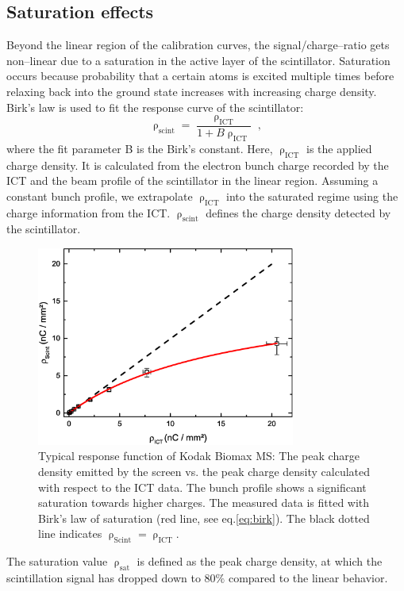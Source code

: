 \documentclass[%
preprint,
amsmath,
amssymb,
aip,
rsi, 
numerical,
floatfix,
]{revtex4-1}
\begin{document}
\subsection{\label{Se}Saturation effects}
Beyond the linear region of the calibration curves, the signal/charge--ratio gets non--linear due to a saturation in the active layer of the scintillator.
Saturation occurs because probability that a certain atoms is excited multiple times before relaxing back into the ground state increases with increasing charge density.
Birk’s law is used to fit the response curve of the scintillator:
\begin{equation}
\uprho_{\text{scint}} = \frac{\uprho_{\text{ICT}}}{1+B\uprho_{\text{ICT}}}{\;,}
\label{eq:birk}
\end{equation}
where the fit parameter B is the Birk's constant.
Here, $\uprho_{\text{ICT}}$ is the applied charge density.
It is calculated from the electron bunch charge recorded by the ICT and the beam profile of the scintillator in the linear region. 
Assuming a constant bunch profile, we extrapolate $\uprho_{\text{ICT}}$ into the saturated regime using the charge information from the ICT. $\uprho_{\text{scint}}$ defines the charge density detected by the scintillator.
\begin{figure}
\includegraphics[width=8.5cm]{./Figures/Sat_V2}%
\caption{\label{fig:Sat} Typical response function of Kodak Biomax MS: The peak charge density emitted by the screen vs. the peak charge density calculated with respect to the ICT data. 
The bunch profile shows a significant saturation towards higher charges. 
The measured data is fitted with Birk's law of saturation (red line, see eq.\ref{eq:birk}). 
The black dotted line indicates $\uprho_{\text{Scint}} = \uprho_{\text{ICT}}$.}
\end{figure}
The saturation value $\uprho_{\text{sat}}$ is defined as the peak charge density, at which the scintillation signal has dropped down to 80$\%$ compared to the linear behavior.
\end{document}
